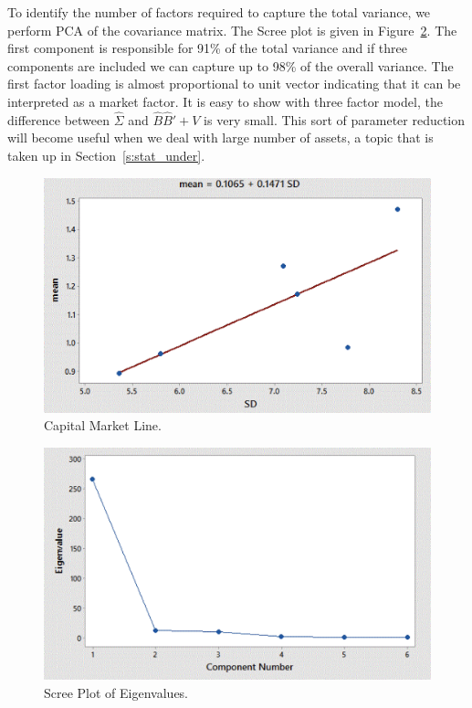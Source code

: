 To identify the number of factors required to capture the total variance, we perform PCA of the covariance matrix. The Scree plot is given in Figure~\ref{fig:screeplot}. The first component is responsible for 91\% of the total variance and if three components are included we can capture up to 98\% of the overall variance. The first factor loading is almost proportional to unit vector indicating that it can be interpreted as a market factor. It is easy to show with three factor model, the difference between $\hat{\Sigma}$ and $\hat{B}\hat{B}'+V$ is very small. This sort of parameter reduction will become useful when we deal with large number of assets, a topic that is taken up in Section~\ref{s:stat_under}.


        \begin{figure}[!ht]
        \centering
        \includegraphics[width=\textwidth]{chapters/chapter_apm/figures/capmarket.png} 
        \caption{Capital Market Line.\label{fig:capmarket}}
        \end{figure}


        \begin{figure}[!ht]
        \centering
        \includegraphics[width=\textwidth]{chapters/chapter_apm/figures/scree.png} 
        \caption{Scree Plot of Eigenvalues.\label{fig:screeplot}}
        \end{figure}
	


